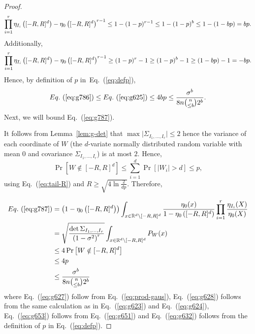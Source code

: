 \documentclass[final, 12pt]{colt2018}
\renewcommand{\eqref}[1]{Eq.~(\ref{#1})}
\begin{document}
\begin{proof}
\begin{equation*}
\prod_{i=1}^r \eta_{I_i}\left([-R,R]^d\right) - \eta_0\left([-R,R]^d\right)^{r-1}
\le 1 - (1-p)^{r-1}
\le 1 - (1-p)^b
\le 1 - (1-bp)
= bp \notag.
\end{equation*}
Additionally,
\begin{equation*}
\prod_{i=1}^r \eta_{I_i}\left([-R,R]^d\right) - \eta_0\left([-R,R]^d\right)^{r-1}
\ge (1-p)^r - 1
\ge (1-p)^b - 1
\ge (1-bp) - 1
= -bp \notag.
\end{equation*}
Hence, by definition of $p$ in~\eqref{eq:defp},
\begin{equation} \label{eq:g626}
\eqref{eq:g786}
\le \eqref{eq:g625}
\le 4 bp
\le \frac{\sigma^b}{8n {\binom{n}{\le b}} 2^b}.
\end{equation}
Next, we will bound \eqref{eq:g787}.

It follows from Lemma~\ref{lem:g-det} that $\max \lvert \Sigma_{I_1,\dots,I_r} \rvert \le 2$ hence the variance of each coordinate of $W$ (the $d$-variate normally distributed random variable with mean $0$ and covariance $\Sigma_{I_1,\dots,I_r}$) is at most $2$. Hence,
\begin{equation} \label{eq:g651}
\Pr\left[W \notin [-R,R]^d\right]
\le \sum_{i=1}^d \Pr\left[\lvert W_i \rvert > d \right]
\le p,
\end{equation}
using \eqref{eq:tail-R} and $R \ge \sqrt{4 \ln \frac{2}{dp}}$. Therefore,

\begin{align}
\eqref{eq:g787}
&= \left(1 - \eta_0\left([-R,R]^d\right)\right) \int_{x \in \mathbb{R}^d \setminus [-R,R]^d} \frac{\eta_0(x)}{1 - \eta_0\left([-R,R]^d\right)} \prod_{i=1}^r \frac{\eta_{I_i}(X)}{\eta_0(X)} \notag \\
&= \sqrt{\frac{\det \Sigma_{I_1, \dots, I_r}}{\left(1-\sigma^2\right)^r}} \int_{x \in \mathbb{R}^d \setminus [-R,R]^d} P_W(x) \label{eq:g627} \\
&\le 4 \Pr\left[ W \notin [-R,R]^d \right] \label{eq:g628} \\
&\le 4 p \label{eq:g653}\\
&\le \frac{\sigma^b}{8n {\binom{n}{\le b}} 2^b} \label{eq:g632}
\end{align}
where \eqref{eq:g627} follow from \eqref{eq:prod-gaus}, \eqref{eq:g628} follows from the same calculation as in \eqref{eq:g623} and \eqref{eq:g624}, \eqref{eq:g653} follows from \eqref{eq:g651} and \eqref{eq:g632} follows from the definition of $p$ in \eqref{eq:defp}.


\end{proof}
\end{document}
